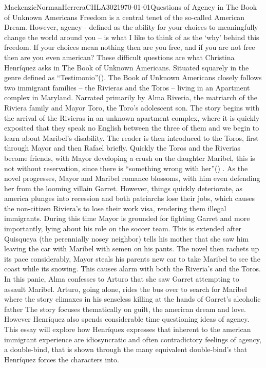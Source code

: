 \documentclass{article}
\begin{document}
\begin{mla}{Mackenzie}{Norman}{Herrera}{CHLA302}{\today}{Questions of Agency in The Book of Unknown Americans}
Freedom is a central tenet of the so-called American Dream. However, agency - defined as the ability for your choices to  meaningfully change the world around you -- is what I like to think of as the `why' behind this freedom. If your choices mean nothing then are you free, and if you are not free then are you even american? These difficult questions are what Christina Henríquez asks in The Book of Unknown Americans. Situated squarely in the genre defined as ``Testimonio''(\cite{testimonio}). The Book of Unknown Americans closely follows two immigrant families -- the Rivieras and the Toros -- living in an Apartment complex in Maryland. Narrated primarily by Alma Riveria, the matriarch of the Riviera family and Mayor Toro, the Toro's adolescent son. The story begins with the arrival of the Rivieras in an unknown apartment complex, where it is quickly exposited that they speak no English between the three of them and we begin to learn about Maribel's disability. The reader is then introduced to the Toros, first through Mayor and then Rafael briefly. Quickly the Toros and the Riverias become friends, with Mayor developing a crush on the daughter Maribel, this is not without reservation, since there is ``something wrong with her''(\cite{Henriquez2014-sh}) . As the novel progresses, Mayor and Maribel romance blossoms, with him even defending her from the looming villain Garret. However, things quickly deteriorate, as america plunges into recession and both patriarchs lose their jobs, which causes the non-citizen Riviera's to lose their work visa, rendering them illegal immigrants. During this time Mayor is grounded for fighting Garret and more importantly, lying about his role on the soccer team. This is extended after Quisqueya (the perennially nosey neighbor) tells his mother that she saw him   leaving the car with Maribel with semen on his pants. The novel then rachets up its pace considerably, Mayor steals his parents new car to take Maribel to see the coast while its snowing. This causes alarm with both the Riveria's and the Toros. In this panic, Alma confesses to Arturo that she saw Garret attempting to assault Maribel. Arturo, going alone, rides the bus over to search for Maribel where the story climaxes in his senseless killing at the hands of Garret's alcoholic father The story focuses thematically on guilt, the american dream and love. However Henríquez also spends considerable time questioning ideas of agency. This essay will explore how Henríquez expresses that inherent to the american immigrant experience are idiosyncratic and often contradictory feelings of agency, a double-bind, that is shown through the many equivalent double-bind's that Henríquez forces the characters into.


\end{mla}
\end{document}
